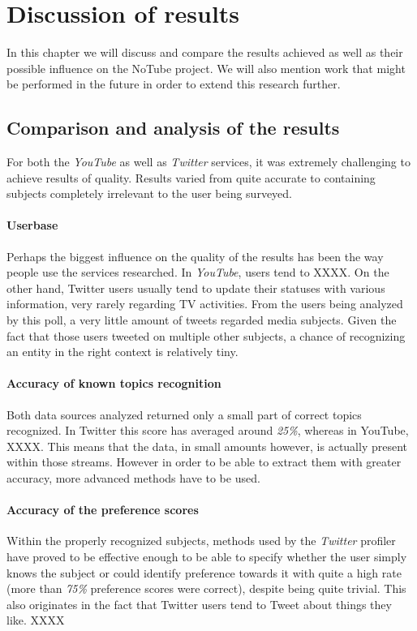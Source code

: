 \section{Discussion of results}
In this chapter we will discuss and compare the results achieved as well as their possible influence on the NoTube project. We will also mention work that might be performed in the future in order to extend this research further.

\subsection{Comparison and analysis of the results}
For both the \textit{YouTube} as well as \textit{Twitter} services, it was extremely challenging to achieve results of
quality. Results varied from quite accurate to containing subjects completely irrelevant to the user being surveyed.

\paragraph{Userbase}
Perhaps the biggest influence on the quality of the results has been the way people use the services researched.
In \textit{YouTube}, users tend to XXXX. On the other hand, Twitter users usually tend to update their statuses
with various information, very rarely regarding TV activities. From the users being analyzed by this poll, a very
little amount of tweets regarded media subjects. Given the fact that those users tweeted on multiple other subjects,
a chance of recognizing an entity in the right context is relatively tiny.

\paragraph{Accuracy of known topics recognition}
Both data sources analyzed returned only a small part of correct topics recognized. In Twitter this score has
averaged around \textit{25\%}, whereas in YouTube, XXXX. This means that the data, in small amounts however, is actually present
within those streams. However in order to be able to extract them with greater accuracy, more advanced methods have
to be used.

\paragraph{Accuracy of the preference scores}
Within the properly recognized subjects, methods used by the \textit{Twitter} profiler have proved to be effective enough
to be able to specify whether the user simply knows the subject or could identify preference towards it with quite a high
rate (more than \textit{75\%} preference scores were correct), despite being quite trivial. This also originates in the fact
that Twitter users tend to Tweet about things they like. XXXX

